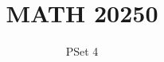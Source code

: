 \documentclass{article}
\newenvironment{problem}[2][Problem]{\begin{trivlist}
\item[\hskip \labelsep {\bfseries #1}\hskip \labelsep {\bfseries #2.}]}{\end{trivlist}}
\begin{document}
\newcommand{\s}[0]{\sin(\theta)}
\newcommand{\cs}[0]{\cos(\theta)}
\newcommand{\spa}[0]{\hspace{1mm}}

\title{MATH 20250} %
\author{PSet 4 } %

\maketitle

%
%

\begin{problem}{9.17}
\end{problem}
\end{document}
